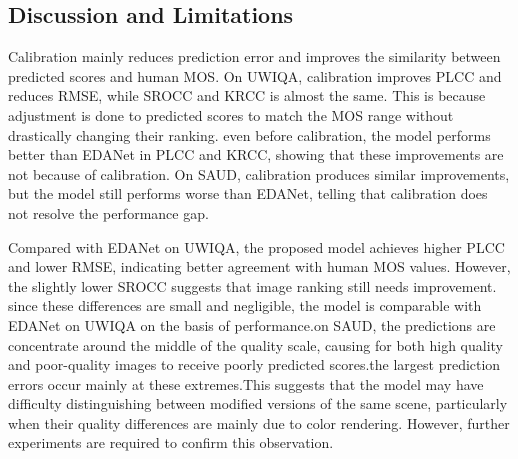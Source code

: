 \documentclass[conference]{IEEEtran}
\begin{document}
\subsection{Discussion and Limitations}

Calibration mainly reduces prediction error and improves the similarity between predicted scores and human MOS. On UWIQA, calibration improves PLCC and reduces RMSE, while SROCC and KRCC is almost the same. This is because adjustment is done to predicted scores to match the MOS range without drastically changing their ranking. even before calibration, the model performs better than EDANet in PLCC and KRCC, showing that these improvements are not because of calibration. On SAUD, calibration produces similar improvements, but the model still performs worse than EDANet, telling that calibration does not resolve the performance gap.

Compared with EDANet on UWIQA, the proposed model achieves higher PLCC and lower RMSE, indicating better agreement with human MOS values. However, the slightly lower SROCC suggests that image ranking still needs improvement. since these differences are small and negligible, the model is comparable with EDANet on UWIQA on the basis of performance.on SAUD, the predictions are concentrate around the middle of the quality scale, causing for both high quality and poor-quality  images to receive poorly predicted scores.the largest prediction errors occur mainly at these extremes.This suggests that the model may have difficulty distinguishing between modified versions of the same scene, particularly when their quality differences are mainly due to color rendering. However, further experiments are required to confirm this observation.
\vspace{0.3cm}
\end{document}
